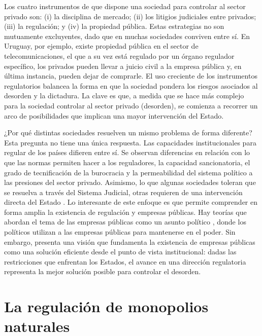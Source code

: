\documentclass[
  12pt,
  spanish,
]{book}
\begin{document}
Los cuatro instrumentos de que dispone una sociedad para controlar al
sector privado son: (i) la disciplina de mercado; (ii) los litigios
judiciales entre privados; (iii) la regulación; y (iv) la propiedad
pública. Estas estrategias no son mutuamente excluyentes, dado que en
muchas sociedades conviven entre sí. En Uruguay, por ejemplo, existe
propiedad pública en el sector de telecomunicaciones, el que a su vez
está regulado por un órgano regulador específico, los privados pueden
llevar a juicio civil a la empresa pública y, en última instancia,
pueden dejar de comprarle. El uso creciente de los instrumentos
regulatorios balancea la forma en que la sociedad pondera los riesgos
asociados al desorden y la dictadura. La clave es que, a medida que se
hace más complejo para la sociedad controlar al sector privado
(desorden), se comienza a recorrer un arco de posibilidades que implican
una mayor intervención del Estado.

¿Por qué distintas sociedades resuelven un mismo problema de forma
diferente? Esta pregunta no tiene una única respuesta. Las capacidades
institucionales para regular de los países difieren entre sí. Se
observan diferencias en relación con lo que las normas permiten hacer a
los reguladores, la capacidad sancionatoria, el grado de tecnificación
de la burocracia y la permeabilidad del sistema político a las presiones
del sector privado. Asimismo, lo que algunas sociedades toleran que se
resuelva a través del Sistema Judicial, otras requieren de una
intervención directa del Estado \citep{Alesina2005}. Lo interesante de
este enfoque es que permite comprender en forma amplia la existencia de
regulación y empresas públicas. Hay teorías que abordan el tema de las
empresas públicas como un asunto político \citep{Shleifer1994}, donde
los políticos utilizan a las empresas públicas para mantenerse en el
poder. Sin embargo, \citet{Shleifer2005} presenta una visión que
fundamenta la existencia de empresas públicas como una solución
eficiente desde el punto de vista institucional: dadas las restricciones
que enfrentan los Estados, el avance en una dirección regulatoria
representa la mejor solución posible para controlar el desorden.

\hypertarget{la-regulaciuxf3n-de-monopolios-naturales}{%
\section{La regulación de monopolios
naturales}\label{la-regulaciuxf3n-de-monopolios-naturales}}
\end{document}
